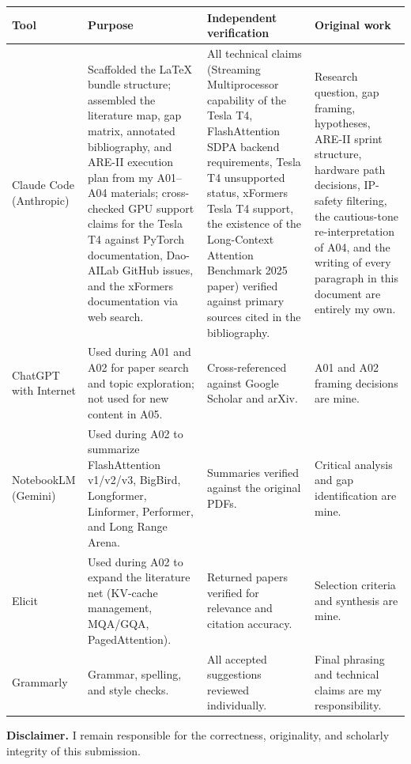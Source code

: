 \documentclass[11pt]{article}
\begin{document}
\begin{small}
\renewcommand{\arraystretch}{1.4}
\begin{tabularx}{\textwidth}{p{2.4cm} X p{3.0cm} p{3.4cm}}
\toprule
\textbf{Tool} & \textbf{Purpose} & \textbf{Independent verification} & \textbf{Original work} \\
\midrule
Claude Code (Anthropic) & Scaffolded the LaTeX bundle structure; assembled the literature map, gap matrix, annotated bibliography, and ARE-II execution plan from my A01--A04 materials; cross-checked GPU support claims for the Tesla T4 against PyTorch documentation, Dao-AILab GitHub issues, and the xFormers documentation via web search. & All technical claims (Streaming Multiprocessor capability of the Tesla T4, FlashAttention SDPA backend requirements, Tesla T4 unsupported status, xFormers Tesla T4 support, the existence of the Long-Context Attention Benchmark 2025 paper) verified against primary sources cited in the bibliography. & Research question, gap framing, hypotheses, ARE-II sprint structure, hardware path decisions, IP-safety filtering, the cautious-tone re-interpretation of A04, and the writing of every paragraph in this document are entirely my own. \\
\addlinespace
ChatGPT with Internet & Used during A01 and A02 for paper search and topic exploration; not used for new content in A05. & Cross-referenced against Google Scholar and arXiv. & A01 and A02 framing decisions are mine. \\
\addlinespace
NotebookLM (Gemini) & Used during A02 to summarize FlashAttention v1/v2/v3, BigBird, Longformer, Linformer, Performer, and Long Range Arena. & Summaries verified against the original PDFs. & Critical analysis and gap identification are mine. \\
\addlinespace
Elicit & Used during A02 to expand the literature net (KV-cache management, MQA/GQA, PagedAttention). & Returned papers verified for relevance and citation accuracy. & Selection criteria and synthesis are mine. \\
\addlinespace
Grammarly & Grammar, spelling, and style checks. & All accepted suggestions reviewed individually. & Final phrasing and technical claims are my responsibility. \\
\bottomrule
\end{tabularx}
\end{small}

\noindent\textbf{Disclaimer.} I remain responsible for the correctness, originality, and scholarly integrity of this submission.

\newpage
\nocite{*}
\printbibliography[title={References}]
\end{document}
